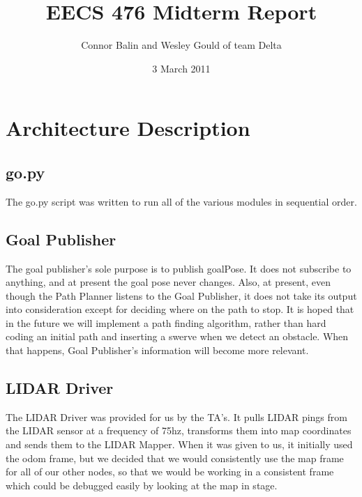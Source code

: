 \documentclass{article}
\author{Connor Balin and Wesley Gould of team Delta}
\title{EECS 476 Midterm Report}
\date{3 March 2011}
\begin{document}
\maketitle


\section{Architecture Description}
\lstset{language=python}
\subsection{go.py}

The go.py script was written to run all of the various modules in sequential order.




\lstset{language=C++}
\subsection{Goal Publisher}

The goal publisher's sole purpose is to publish goalPose.
It does not subscribe to anything, and at present the goal pose never changes.
Also, at present, even though the Path Planner listens to the Goal Publisher, it does not take its output into consideration except for deciding where on the path to stop.
It is hoped that in the future we will implement a path finding algorithm, rather than hard coding an initial path and inserting a swerve when we detect an obstacle.
When that happens, Goal Publisher's information will become more relevant.



\subsection{LIDAR Driver}

The LIDAR Driver was provided for us by the TA's.
It pulls LIDAR pings from the LIDAR sensor at a frequency of 75hz, transforms them into map coordinates and sends them to the LIDAR Mapper.
When it was given to us, it initially used the odom frame, but we decided that we would consistently use the map frame for all of our other nodes, so that we would be working in a consistent frame which could be debugged easily by looking at the map in stage.
\end{document}
